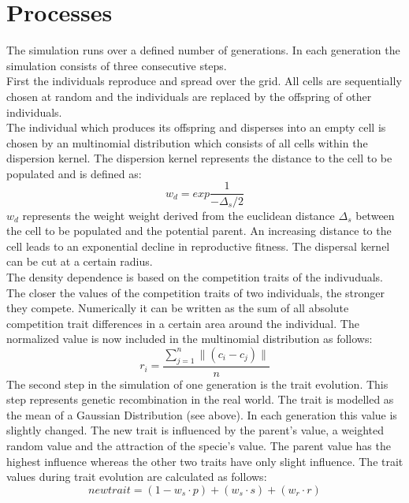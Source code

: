 \documentclass [a4paper]{tufte-book}\usepackage[]{graphicx}\usepackage[]{color}
\begin{document}
\section{Processes}
The simulation runs over a defined number of generations. 
In each generation the simulation consists of three consecutive steps.\\
First the individuals reproduce and spread over the grid. All cells are sequentially chosen at random and the individuals are replaced by the offspring of other individuals.\\
The individual which produces its offspring and disperses into an empty cell is chosen by an multinomial distribution which consists of all cells within the dispersion kernel.
The dispersion kernel represents the distance to the cell to be populated and is defined as:
\begin{equation}
w_d = exp\frac{1}{-\Delta_s/2}
\end{equation}
$w_d$ represents the weight weight derived from the euclidean distance $\Delta_s$ between the
cell to be populated and the potential parent. An increasing distance to the cell leads to an exponential decline in reproductive fitness. The dispersal kernel can be cut at a certain radius.\\
The density dependence is based on the competition traits of the indivuduals. The closer the values of the competition traits of two individuals, the stronger they compete. Numerically it can be written as the sum of all absolute competition trait differences in a certain area around the individual. The normalized value is now included in the multinomial distribution as follows:
\begin{equation}
r_i = \frac{\sum_{j=1}^{n}{\parallel(c_i-c_j)}\parallel}{n}
\end{equation}
The second step in the simulation of one generation is the trait evolution. This step represents genetic recombination in the real world.
The trait is modelled as the mean of a Gaussian Distribution (see above). In each generation this value is slightly changed. The new trait is influenced by the parent's value, a weighted random value and the attraction of the specie's value. The parent value has the highest influence whereas the other two traits have only slight influence.
The trait values during trait evolution are calculated as follows:
\begin{equation}
newtrait = (1-w_s \cdot p) + (w_s \cdot s) + (w_r \cdot r)
\end{equation}
\end{document}
